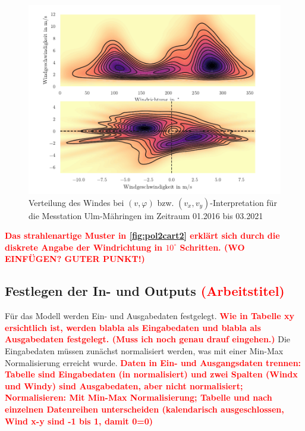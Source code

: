 \documentclass[
12pt, %
toc=listofnumbered, %
toc=chapterentrydotfill, %
numbers=noenddot, %
captions=tableheading, %
]{scrreprt}
\let\Oldsubsection\subsection
\renewcommand{\subsection}{\FloatBarrier\Oldsubsection}
\newcommand{\highlight}[1]{\textbf{\textcolor{red}{#1}}}
\newcommand{\Abb}[1]{\autoref{fig:#1}}
\begin{document}
\begin{figure}[tph]
	\begin{center}
		\includegraphics[scale = 1]{./images/pol2cart_visualize.pdf}
		\caption{Verteilung des Windes bei $(v,\varphi)$ bzw. $(v_x,v_y)$-Interpretation für die Messtation Ulm-Mähringen im Zeitraum 01.2016 bis 03.2021}
		\label{fig:pol2cart2}
	\end{center}
\end{figure}

\highlight{Das strahlenartige Muster in \Abb{pol2cart2} erklärt sich durch die diskrete Angabe der Windrichtung in $10^\circ$ Schritten. (WO EINFÜGEN? GUTER PUNKT!)}

\subsection{Festlegen der In- und Outputs \highlight{(Arbeitstitel)}}
Für das Modell werden Ein- und Ausgabedaten festgelegt. \highlight{Wie in Tabelle xy ersichtlich ist, werden blabla als Eingabedaten und blabla als Ausgabedaten festgelegt. (Muss ich noch genau drauf eingehen.)} Die Eingabedaten müssen zunächst normalisiert werden, was mit einer Min-Max Normalisierung erreicht wurde.
\highlight{Daten in Ein- und Ausgangsdaten trennen: Tabelle sind Eingabedaten (in normalisiert) und zwei Spalten (Windx und Windy) sind Ausgabedaten, aber nicht normalisiert; 
Normalisieren: Mit  Min-Max Normalisierung; Tabelle und nach einzelnen Datenreihen unterscheiden (kalendarisch ausgeschlossen, Wind x-y sind -1 bis 1, damit 0=0)}
\end{document}
